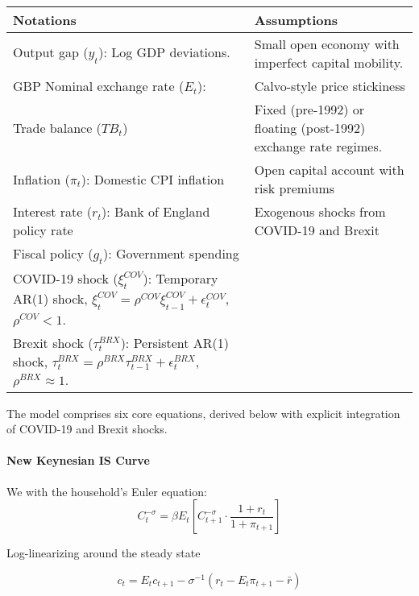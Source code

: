 \documentclass[
]{article}
\let\oldtable\table
\let\endoldtable\endtable
\renewenvironment{table}[1][H]{\oldtable[H]}{\endoldtable}
\begin{document}
\begin{table}[ht]
\centering
\caption{\textsc{Notations and Assumptions} }
\label{tab:notations}
\begin{tabular}{p{} p{}}
\toprule
\textbf{Notations} & \textbf{Assumptions} \\
\midrule
Output gap (\( y_t \)): Log GDP deviations. & Small open economy with imperfect capital mobility. \\[1.5ex] 
GBP Nominal exchange rate (\( E_t \)): & Calvo-style price stickiness %
\\
Trade balance (\( TB_t \)) & Fixed (pre-1992) or floating (post-1992) exchange rate regimes. \\[1.5ex] 
Inflation (\( \pi_t \)): Domestic CPI inflation & Open capital account with risk premiums %
\\
Interest rate (\( r_t \)): Bank of England policy rate & Exogenous shocks from COVID-19 and Brexit %
\\ 
Fiscal policy (\( g_t \)): Government spending & \\
COVID-19 shock (\( \xi_t^{COV} \)): Temporary AR(1) shock, \( \xi_t^{COV} = \rho^{COV} \xi_{t-1}^{COV} + \epsilon_t^{COV} \), \( \rho^{COV} < 1 \). & \\
Brexit shock (\( \tau_t^{BRX} \)): Persistent AR(1) shock, \( \tau_t^{BRX} = \rho^{BRX} \tau_{t-1}^{BRX} + \epsilon_t^{BRX} \), \( \rho^{BRX} \approx 1 \). & \\
\bottomrule
\end{tabular}
\end{table}

The model comprises six core equations, derived below with explicit integration of COVID-19 and Brexit shocks.

\paragraph*{New Keynesian IS Curve}
We with the household's Euler equation:
\begin{equation*}
C_t^{-\sigma} = \beta E_t \left[ C_{t+1}^{-\sigma} \cdot \frac{1 + r_t}{1 + \pi_{t+1}} \right]
\end{equation*}

Log-linearizing around the steady state 

\begin{equation*}
c_t = E_t c_{t+1} - \sigma^{-1} (r_t - E_t \pi_{t+1} - \bar{r})
\end{equation*}
\end{document}
